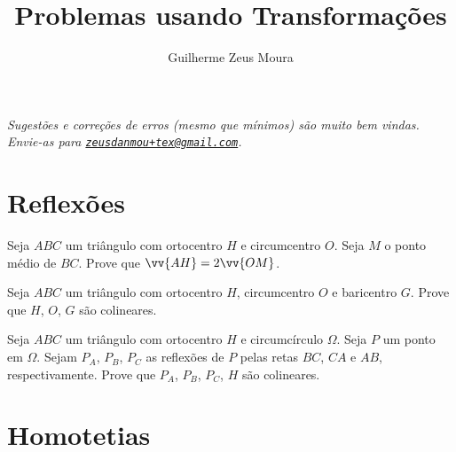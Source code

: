 \documentclass[10pt, a4paper]{article}
\title{Problemas usando Transformações}
\author{Guilherme Zeus Moura}
\begin{document}
	
	\zeustitle
	
	\nocite{Transformations-VKrakovna}
	\nocite{GeometricTransformations-AMustata}
	\nocite{Homotetia-Regis}
	\nocite{Homotetia-DLopes}
	\nocite{EGMO-EChan}

	\begin{center}
		\begin{minipage}{12cm}
		\slshape Sugestões e correções de erros (mesmo que mínimos) são muito bem vindas. Envie-as para \href{mailto:zeusdanmou+tex@gmail.com}{\texttt{zeusdanmou+tex@gmail.com}}.
		\end{minipage}
	\end{center}

	\vspace{.3cm}

	\begin{center}
		\begin{minipage}{12cm}	
			\tableofcontents
		\end{minipage}
	\end{center}

	\vspace{.5cm}

	\section{Reflexões}

	\begin{prob}
		Seja $ABC$ um triângulo com ortocentro $H$ e circumcentro $O$. Seja $M$ o ponto médio de $BC$. Prove que $\vv{AH} = 2\vv{OM}$.
	\end{prob}

	\begin{prob}
		Seja $ABC$ um triângulo com ortocentro $H$, circumcentro $O$ e baricentro $G$. Prove que $H$, $O$, $G$ são colineares.
	\end{prob}

	\begin{prob}
		Seja $ABC$ um triângulo com ortocentro $H$ e circumcírculo $\Omega$. Seja $P$ um ponto em $\Omega$. Sejam $P_A$, $P_B$, $P_C$ as reflexões de $P$ pelas retas $BC$, $CA$ e $AB$, respectivamente. Prove que $P_A$, $P_B$, $P_C$, $H$ são colineares.
	\end{prob}




	\section{Homotetias}
	
\end{document}
